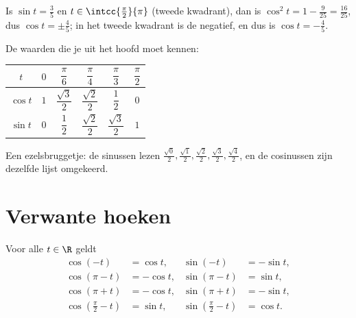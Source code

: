 \begin{example}\label{ex:g11:trigo:identity}
Is $\sin t = \frac35$ en $t \in \intcc{\frac\pi2}{\pi}$ (tweede kwadrant),
dan is $\cos^2 t = 1 - \frac{9}{25} = \frac{16}{25}$, dus
$\cos t = \pm\frac45$; in het tweede kwadrant is de  negatief, en dus
is $\cos t = -\frac45$.
\end{example}

De waarden die je uit het hoofd moet kennen:
\begin{center}
\begin{tabular}{c|ccccc}
$t$ & $0$ & $\dfrac{\pi}{6}$ & $\dfrac{\pi}{4}$ & $\dfrac{\pi}{3}$ & $\dfrac{\pi}{2}$\\[6pt]
\hline\rule{0pt}{14pt}%
$\cos t$ & $1$ & $\dfrac{\sqrt3}{2}$ & $\dfrac{\sqrt2}{2}$ & $\dfrac12$ & $0$\\[6pt]
$\sin t$ & $0$ & $\dfrac12$ & $\dfrac{\sqrt2}{2}$ & $\dfrac{\sqrt3}{2}$ & $1$
\end{tabular}
\end{center}

\begin{remark}
Een ezelsbruggetje: de sinussen lezen
$\frac{\sqrt0}{2}, \frac{\sqrt1}{2}, \frac{\sqrt2}{2}, \frac{\sqrt3}{2},
\frac{\sqrt4}{2}$, en de cosinussen zijn dezelfde lijst omgekeerd.
\end{remark}

\section{Verwante hoeken}

\begin{proposition}\label{prop:g11:trigo:associated}
Voor alle $t \in \R$ geldt
\[
\begin{aligned}
\cos(-t) &= \cos t, & \sin(-t) &= -\sin t,\\
\cos(\pi - t) &= -\cos t, & \sin(\pi - t) &= \sin t,\\
\cos(\pi + t) &= -\cos t, & \sin(\pi + t) &= -\sin t,\\
\cos\left(\tfrac{\pi}{2} - t\right) &= \sin t, &
\sin\left(\tfrac{\pi}{2} - t\right) &= \cos t .
\end{aligned}
\]
\end{proposition}

